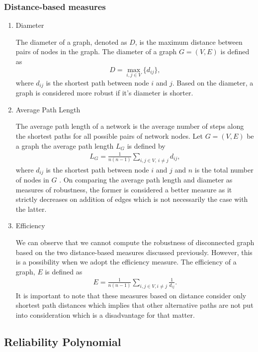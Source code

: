 \documentclass[10pt,a4paper]{article}
\begin{document}
	\subsubsection{Distance-based measures}
	\begin{enumerate}
		\item Diameter
	
		The diameter of a graph, denoted as $D$, is the maximum distance between pairs of nodes in the graph\citep{wang2003complex}. The diameter of a graph $G= (V,E )$ is defined as \[ D = \max_{i,j \in V} \{d_{ij}\},\] where $d_{ij}$ is the shortest path between node $i$ and $j$. Based on the diameter, a graph is considered more robust if it's diameter is shorter.
		\item Average Path Length
		
		The average path length of a network is the average number of steps along the shortest paths for all possible pairs of network nodes. Let $G = (V , E )$ be a graph the average path length $L_G$ is defined by
		\begin{eqnarray}
		L_G = \frac{1}{n(n-1)} \sum_{i,j \in V,~i \neq j} d_{ij},
		\end{eqnarray}
		where $d_{ij}$ is the shortest path between node $i$ and $j$ and $n$ is the total number of nodes in $G$ \citep{wang2003complex}. 
		On comparing the average path length and diameter as measures of robustness, the former is considered a better measure as it strictly decreases on addition of edges which is not necessarily the case with the latter.
		\item Efficiency
		
		We can observe that we cannot compute the robustness of disconnected graph based on the two distance-based measures discussed previously. However, this is a possibility when we adopt the efficiency measure. 
		The efficiency of a graph, $E$ is defined as
		\begin{eqnarray}
			E =\frac{1}{n(n-1)} \sum_{i,j \in V,i\neq j} \frac{1}{d_{ij}}.
			\label{eqn:eff}
		\end{eqnarray}
		It is important to note that these measures based on distance consider only shortest path distances which implies that other alternative paths are not put into consideration which is a disadvantage for that matter.
	\end{enumerate}
	
	\subsection{Reliability Polynomial}
	
\end{document}
